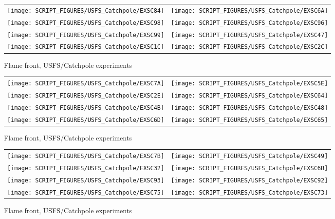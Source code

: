 \begin{figure}[p]
\begin{tabular*}{\textwidth}{l@{\extracolsep{\fill}}r}
\texttt{[image: SCRIPT\_FIGURES/USFS\_Catchpole/EXSC84]} &
\texttt{[image: SCRIPT\_FIGURES/USFS\_Catchpole/EXSC6A]} \\
\texttt{[image: SCRIPT\_FIGURES/USFS\_Catchpole/EXSC98]} &
\texttt{[image: SCRIPT\_FIGURES/USFS\_Catchpole/EXSC96]} \\
\texttt{[image: SCRIPT\_FIGURES/USFS\_Catchpole/EXSC99]} &
\texttt{[image: SCRIPT\_FIGURES/USFS\_Catchpole/EXSC47]} \\
\texttt{[image: SCRIPT\_FIGURES/USFS\_Catchpole/EXSC1C]} &
\texttt{[image: SCRIPT\_FIGURES/USFS\_Catchpole/EXSC2C]} \\
\end{tabular*}
\caption[Flame front, USFS/Catchpole experiments]{Flame front, USFS/Catchpole experiments}
\label{USFS_Catchpole_040}
\end{figure}

\begin{figure}[p]
\begin{tabular*}{\textwidth}{l@{\extracolsep{\fill}}r}
\texttt{[image: SCRIPT\_FIGURES/USFS\_Catchpole/EXSC7A]} &
\texttt{[image: SCRIPT\_FIGURES/USFS\_Catchpole/EXSC5E]} \\
\texttt{[image: SCRIPT\_FIGURES/USFS\_Catchpole/EXSC2E]} &
\texttt{[image: SCRIPT\_FIGURES/USFS\_Catchpole/EXSC64]} \\
\texttt{[image: SCRIPT\_FIGURES/USFS\_Catchpole/EXSC4B]} &
\texttt{[image: SCRIPT\_FIGURES/USFS\_Catchpole/EXSC48]} \\
\texttt{[image: SCRIPT\_FIGURES/USFS\_Catchpole/EXSC6D]} &
\texttt{[image: SCRIPT\_FIGURES/USFS\_Catchpole/EXSC65]} \\
\end{tabular*}
\caption[Flame front, USFS/Catchpole experiments]{Flame front, USFS/Catchpole experiments}
\label{USFS_Catchpole_048}
\end{figure}

\begin{figure}[p]
\begin{tabular*}{\textwidth}{l@{\extracolsep{\fill}}r}
\texttt{[image: SCRIPT\_FIGURES/USFS\_Catchpole/EXSC7B]} &
\texttt{[image: SCRIPT\_FIGURES/USFS\_Catchpole/EXSC49]} \\
\texttt{[image: SCRIPT\_FIGURES/USFS\_Catchpole/EXSC32]} &
\texttt{[image: SCRIPT\_FIGURES/USFS\_Catchpole/EXSC6B]} \\
\texttt{[image: SCRIPT\_FIGURES/USFS\_Catchpole/EXSC93]} &
\texttt{[image: SCRIPT\_FIGURES/USFS\_Catchpole/EXSC92]} \\
\texttt{[image: SCRIPT\_FIGURES/USFS\_Catchpole/EXSC75]} &
\texttt{[image: SCRIPT\_FIGURES/USFS\_Catchpole/EXSC73]} \\
\end{tabular*}
\caption[Flame front, USFS/Catchpole experiments]{Flame front, USFS/Catchpole experiments}
\label{USFS_Catchpole_056}
\end{figure}

